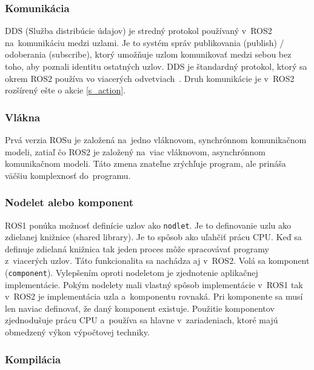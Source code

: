 \newpage
\subsubsection{Komunikácia}

	DDS (Služba distribúcie údajov) je stredný protokol používaný v~ROS2 na~komunikáciu medzi uzlami. Je to systém správ
	publikovania (publish) / odoberania (subscribe), ktorý umožňuje uzlom komunikovať medzi sebou bez toho, aby poznali identitu ostatných uzlov. DDS je
	štandardný protokol, ktorý sa okrem ROS2 používa vo viacerých odvetviach~\cite{chatgpt}. Druh komunikácie je v~ROS2 rozšírený ešte o akcie \ref{s_action}.

\subsubsection{Vlákna}

	Prvá verzia ROSu je založená na~jedno vláknovom, synchrónnom komunikačnom modeli, zatiaľ čo ROS2 je založený na~viac vláknovom, asynchrónnom
	komunikačnom modeli. Táto zmena znateľne zrýchľuje program, ale prináša väčšiu komplexnosť do~programu.

	\subsubsection{Nodelet alebo komponent}

	ROS1 ponúka možnosť definície uzlov ako \texttt{nodlet}. Je to definovanie uzlu ako zdielanej knižnice (shared library). Je to spôsob ako uľahčiť
	prácu CPU. Keď sa definuje zdielaná knižnica tak jeden proces môže spracovávať programy z~viacerých uzlov. Táto funkcionalita sa nachádza aj v~ROS2.
	Volá sa komponent (\texttt{component}). Vylepšením oproti nodeletom je zjednotenie aplikačnej implementácie. Pokým nodelety mali vlastný spôsob
	implementácie v~ROS1 tak v~ROS2 je implementácia uzla a~komponentu rovnaká. Pri komponente sa musí len naviac definovať, že daný komponent existuje.
	Použitie komponentov zjednodušuje prácu CPU a~používa sa hlavne v~zariadeniach, ktoré majú obmedzený výkon výpočtovej techniky.

\subsubsection{Kompilácia}

